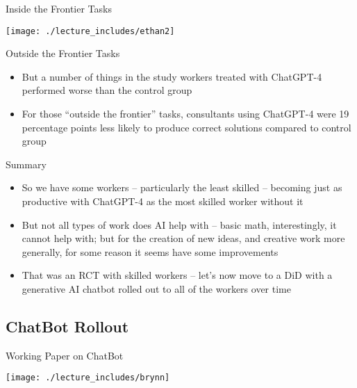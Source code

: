 \documentclass{beamer}
\begin{document}
\begin{frame}{Inside the Frontier Tasks}
\begin{center}
\texttt{[image: ./lecture\_includes/ethan2]}
\end{center}
\end{frame}

\begin{frame}{Outside the Frontier Tasks}

\begin{itemize}

\item But a number of things in the study workers treated with ChatGPT-4 performed worse than the control group
\item For those ``outside the frontier'' tasks, consultants using ChatGPT-4 were 19 percentage points less likely to produce correct solutions compared to control group

\end{itemize}

\end{frame}

\begin{frame}{Summary}

\begin{itemize}

\item So we have some workers -- particularly the least skilled -- becoming just as productive with ChatGPT-4 as the most skilled worker without it
\item But not all types of work does AI help with -- basic math, interestingly, it cannot help with; but for the creation of new ideas, and creative work more generally, for some reason it seems have some improvements
\item That was an RCT with skilled workers -- let's now move to a DiD with a generative AI chatbot rolled out to all of the workers over time

\end{itemize}

\end{frame}


\subsection{ChatBot Rollout}

\begin{frame}{Working Paper on ChatBot}
\begin{center}
\texttt{[image: ./lecture\_includes/brynn]}
\end{center}
\end{frame}
\end{document}
